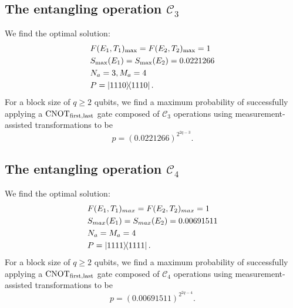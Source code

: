 \documentclass[aps,pra,twocolumn,superscriptaddress,floatfix,10pt]{revtex4}
\begin{document}
\subsection{The entangling operation $\mathcal{C}_3$}
We find the optimal solution:
\begin{eqnarray}
& F(E_1,T_1)_{\rm max} = F(E_2,T_2)_{\rm max} = 1 \nonumber \\
& S_{\rm max}(E_1) = S_{\rm max}(E_2) = 0.0221266 \\
& N_a = 3,M_a=4 \nonumber \\
& P = \outerproduct{1110}{1110} .\nonumber	
\end{eqnarray}
For a block size of $q \ge 2 $ qubits, we find a maximum probability of successfully applying a $\mbox{CNOT}_{\rm first,last}$ gate composed of $\mathcal{C}_3$ operations  using measurement-assisted transformations to be
\begin{equation}
\label{1C4T Result}
p = (0.0221266)^{2^{2q-3}}.
\end{equation}
\subsection{The entangling operation $\mathcal{C}_4$}
We find the optimal solution:
 \begin{eqnarray}
 & F(E_1,T_1)_{max} = F(E_2,T_2)_{max} = 1 \nonumber\\
 & S_{max}(E_1) = S_{max}(E_2) = 0.00691511 \\
 & N_a = M_a=4 \nonumber\\
 & P = \outerproduct{1111}{1111}. \nonumber	
 \end{eqnarray}
For a block size of $q \ge 2$ qubits, we find a maximum probability of successfully applying a $\mbox{CNOT}_{\rm first,last}$ gate composed of $\mathcal{C}_4$ operations  using measurement-assisted transformations to be
 \begin{equation}
 \label{2C4T Result}
 p = (0.00691511)^{2^{2q-4}}.
 \end{equation}
\end{document}
